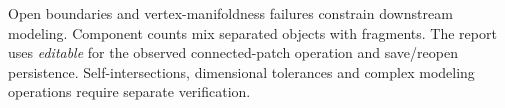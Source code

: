 Open boundaries and vertex-manifoldness failures constrain downstream modeling. Component counts mix separated objects with fragments. The report uses \emph{editable} for the observed connected-patch operation and save/reopen persistence. Self-intersections, dimensional tolerances and complex modeling operations require separate verification.
